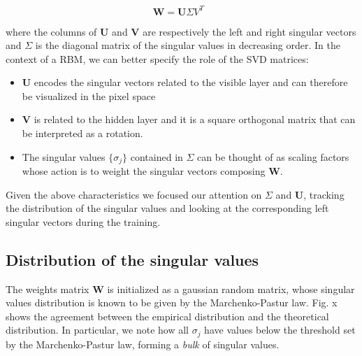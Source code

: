 \documentclass[twocolumn]{article}
\begin{document}
\begin{equation}
\textbf{W} = \textbf{U\(\Sigma V^T \) } 
\end{equation}

where the columns of \textbf{U} and \textbf{V} are respectively the left and right singular vectors and \textbf{\(\Sigma\)} is the diagonal matrix of the singular values in decreasing order. 
In the context of a RBM, we can better specify the role of the SVD matrices:

\begin{itemize}
\item \textbf{U} encodes the singular vectors related to the visible layer and can therefore be visualized in the pixel space
\item  \textbf{V} is related to the hidden layer and it is a square orthogonal matrix that can be interpreted as a rotation. 
\item The singular values \( \{ {\sigma}_j \} \) contained in \textbf{\(\Sigma\)} can be thought of as scaling factors whose action is to weight the singular vectors composing \textbf{W}.
\end{itemize}

Given the above characteristics we focused our attention on \textbf{\(\Sigma\)} and \textbf{U}, tracking the distribution of the singular values and looking at the corresponding left singular vectors during the training.

\subsection{Distribution of the singular values}
The weights matrix \(\textbf{W}\) is initialized as a gaussian random matrix, whose singular values distribution is known to be given by the Marchenko-Pastur law. Fig. x shows the agreement between the empirical distribution and the theoretical distribution. In particular, we note how all \(\sigma_j\) have values below the threshold set by the Marchenko-Pastur law, forming a \textit{bulk} of singular values.
\end{document}
